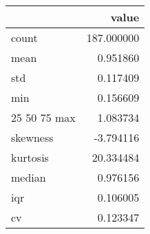 \begin{tabular}{lr}
\toprule
 & value \\
\midrule
count & 187.000000 \\
mean & 0.951860 \\
std & 0.117409 \\
min & 0.156609 \\
25%
50%
75%
max & 1.083734 \\
skewness & -3.794116 \\
kurtosis & 20.334484 \\
median & 0.976156 \\
iqr & 0.106005 \\
cv & 0.123347 \\
\bottomrule
\end{tabular}
